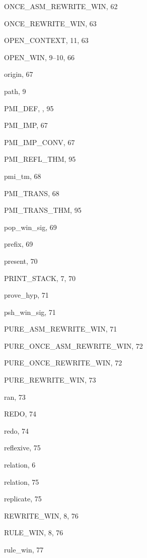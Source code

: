 \begin{theindex}
  \indexspace

  \item {\ptt ONCE\_ASM\_REWRITE\_WIN}, 62
  \item {\ptt ONCE\_REWRITE\_WIN}, 63
  \item {\ptt OPEN\_CONTEXT}, 11, 63
  \item {\ptt OPEN\_WIN}, 9--10, 66
  \item {\ptt origin}, 67

  \indexspace

  \item {\ptt path}, 9
  \item {\ptt PMI\_DEF}, , 95
  \item {\ptt PMI\_IMP}, 67
  \item {\ptt PMI\_IMP\_CONV}, 67
  \item {\ptt PMI\_REFL\_THM}, 95
  \item {\ptt pmi\_tm}, 68
  \item {\ptt PMI\_TRANS}, 68
  \item {\ptt PMI\_TRANS\_THM}, 95
  \item {\ptt pop\_win\_sig}, 69
  \item {\ptt prefix}, 69
  \item {\ptt present}, 70
  \item {\ptt PRINT\_STACK}, 7, 70
  \item {\ptt prove\_hyp}, 71
  \item {\ptt psh\_win\_sig}, 71
  \item {\ptt PURE\_ASM\_REWRITE\_WIN}, 71
  \item {\ptt PURE\_ONCE\_ASM\_REWRITE\_WIN}, 72
  \item {\ptt PURE\_ONCE\_REWRITE\_WIN}, 72
  \item {\ptt PURE\_REWRITE\_WIN}, 73

  \indexspace

  \item {\ptt ran}, 73
  \item {\ptt REDO}, 74
  \item {\ptt redo}, 74
  \item {\ptt reflexive}, 75
  \item relation, 6
  \item {\ptt relation}, 75
  \item {\ptt replicate}, 75
  \item {\ptt REWRITE\_WIN}, 8, 76
  \item {\ptt RULE\_WIN}, 8, 76
  \item {\ptt rule\_win}, 77


\end{theindex}
